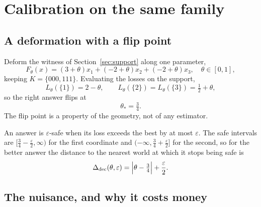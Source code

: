 \section{Calibration on the same family}
\label{sec:calibration}

\subsection{A deformation with a flip point}

Deform the witness of Section~\ref{sec:support} along one parameter,
\begin{equation}
F_{\theta}(x)=(3+\theta)x_{1}+(-2+\theta)x_{2}+(-2+\theta)x_{3},\quad\theta\in[0,1],
\label{eq:thetafamily}
\end{equation}
keeping $K=\{000,111\}$. Evaluating the losses on the support,
\begin{equation}
L_{\theta}(\{1\})=2-\theta,\qquad L_{\theta}(\{2\})=L_{\theta}(\{3\})=\tfrac12+\theta,
\label{eq:thetalosses}
\end{equation}
so the right answer flips at
\begin{equation}
\theta_{*}=\tfrac34 .
\label{eq:flip}
\end{equation}
The flip point is a property of the geometry, not of any estimator.


An answer is $\varepsilon$-safe when its loss exceeds the best by at most $\varepsilon$.
The safe intervals are $[\tfrac34-\tfrac{\varepsilon}{2},\infty)$ for the first coordinate
and $(-\infty,\tfrac34+\tfrac{\varepsilon}{2}]$ for the second, so for the better answer
the distance to the nearest world at which it stops being safe is
\begin{equation}
\Delta_{\rm dec}(\theta,\varepsilon)=\Bigl|\theta-\tfrac34\Bigr|+\frac{\varepsilon}{2}.
\label{eq:deltadec}
\end{equation}


\subsection{The nuisance, and why it costs money}


